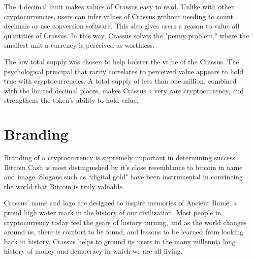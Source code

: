 \documentclass[12pt]{article}
\begin{document}
The 4 decimal limit makes values of Crassus easy to read.  Unlike with other cryptocurrencies, users can infer values of Crassus without needing to count decimals or use conversion software.  This also gives users a reason to value all quantities of Crassus.  In this way, Crassus solves the "penny problem," where the smallest unit a currency is perceived as worthless.

The low total supply was chosen to help bolster the value of the Crassus.  The psychological principal that rarity correlates to perceived value appears to hold true with cryptocurrencies.  A total supply of less than one million, combined with the limited decimal places, makes Crassus a very rare cryptocurrency, and strengthens the token's ability to hold value.


\section{Branding}\label{Branding}
Branding of a cryptocurrency is supremely important in determining success.  Bitcoin Cash is most distinguished by it's close resemblance to bitcoin in name and image.  Slogans such as ``digital gold" have been instrumental in convincing the world that Bitcoin is truly valuable.

Crassus' name and logo are designed to inspire memories of Ancient Rome, a proud high water mark in the history of our civilization.  Most people in cryptocurrency today feel the gears of history turning, and as the world changes around us, there is comfort to be found, and lessons to be learned from looking back in history.  Crassus helps to ground its users in the many millennia long history of money and democracy in which we are all living.



\end{document}
